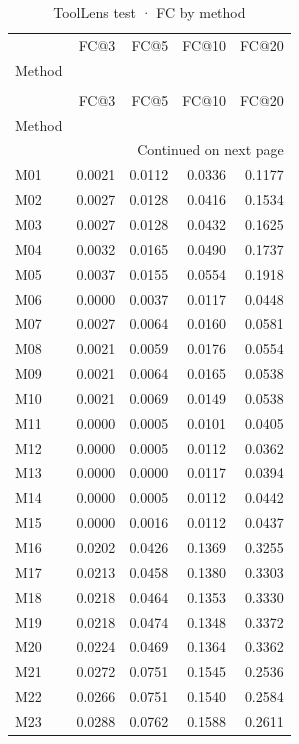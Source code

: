 \begin{longtable}{lrrrr}
\caption{ToolLens test · FC by method} \label{tab:ToolLens-test-family-family-fullcoverage} \\
\toprule
 & FC@3 & FC@5 & FC@10 & FC@20 \\
Method &  &  &  &  \\
\midrule
\endfirsthead
\caption[]{ToolLens test · FC by method} \\
\toprule
 & FC@3 & FC@5 & FC@10 & FC@20 \\
Method &  &  &  &  \\
\midrule
\endhead
\midrule
\multicolumn{5}{r}{Continued on next page} \\
\midrule
\endfoot
\bottomrule
\endlastfoot
M01 & 0.0021 & 0.0112 & 0.0336 & 0.1177 \\
M02 & 0.0027 & 0.0128 & 0.0416 & 0.1534 \\
M03 & 0.0027 & 0.0128 & 0.0432 & 0.1625 \\
M04 & 0.0032 & 0.0165 & 0.0490 & 0.1737 \\
M05 & 0.0037 & 0.0155 & 0.0554 & 0.1918 \\
M06 & 0.0000 & 0.0037 & 0.0117 & 0.0448 \\
M07 & 0.0027 & 0.0064 & 0.0160 & 0.0581 \\
M08 & 0.0021 & 0.0059 & 0.0176 & 0.0554 \\
M09 & 0.0021 & 0.0064 & 0.0165 & 0.0538 \\
M10 & 0.0021 & 0.0069 & 0.0149 & 0.0538 \\
M11 & 0.0000 & 0.0005 & 0.0101 & 0.0405 \\
M12 & 0.0000 & 0.0005 & 0.0112 & 0.0362 \\
M13 & 0.0000 & 0.0000 & 0.0117 & 0.0394 \\
M14 & 0.0000 & 0.0005 & 0.0112 & 0.0442 \\
M15 & 0.0000 & 0.0016 & 0.0112 & 0.0437 \\
M16 & 0.0202 & 0.0426 & 0.1369 & 0.3255 \\
M17 & 0.0213 & 0.0458 & 0.1380 & 0.3303 \\
M18 & 0.0218 & 0.0464 & 0.1353 & 0.3330 \\
M19 & 0.0218 & 0.0474 & 0.1348 & 0.3372 \\
M20 & 0.0224 & 0.0469 & 0.1364 & 0.3362 \\
M21 & 0.0272 & 0.0751 & 0.1545 & 0.2536 \\
M22 & 0.0266 & 0.0751 & 0.1540 & 0.2584 \\
M23 & 0.0288 & 0.0762 & 0.1588 & 0.2611 \\

\end{longtable}
